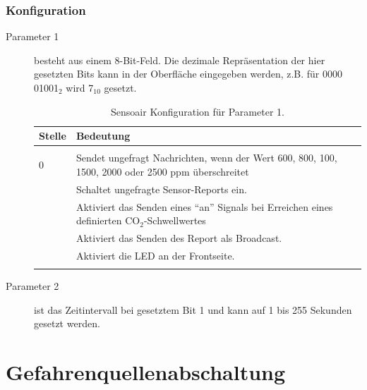 \subsubsection{Konfiguration}
\begin{description}
	\item [Parameter 1] besteht aus einem 8-Bit-Feld. Die dezimale Repräsentation der hier gesetzten Bits kann in der Oberfläche eingegeben werden, z.B. für 0000 01001$_2$ wird 7$_{10}$ gesetzt.
	\begin{longtabu} to 
		\hline
		\textbf{Stelle}		& \textbf{Bedeutung} \\
		\hline
		\endhead
		  \\ 
		\endfoot
		\endlastfoot
		0					& Sendet ungefragt Nachrichten, wenn der Wert 600, 800, 100, 1500, 2000 oder 2500 \gls{ppm} überschreitet\\ 
							& Schaltet ungefragte Sensor-Reports ein.
		\\
							& Aktiviert das Senden eines "`an"' Signals bei Erreichen eines definierten CO$_2$-Schwellwertes \\
							& Aktiviert das Senden des Report als Broadcast. \\
							& Aktiviert die LED an der Frontseite. \\
		\hline
		\caption{Sensoair Konfiguration für Parameter 1.}
	\end{longtabu}
	\item [Parameter 2] ist das Zeitintervall bei gesetztem Bit 1 und kann auf 1 bis 255 Sekunden gesetzt werden.
\end{description}

\section{Gefahrenquellenabschaltung}

